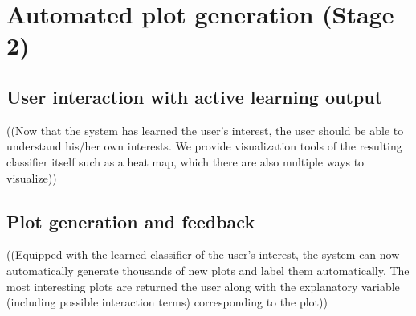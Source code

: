 \section{Automated plot generation (Stage 2)}
\label{sec:visualizer:plotgeneration}

\subsection{User interaction with active learning output}
\label{sec:visualizer:plotgeneration:user}

((Now that the system has learned the user’s interest, the user should be able to understand his/her own interests. We provide visualization tools of the resulting classifier itself such as a heat map, which there are also multiple ways to visualize))

\subsection{Plot generation and feedback}
\label{sec:visualizer:plotgeneration:feedback}

((Equipped with the learned classifier of the user’s interest, the system can now automatically generate thousands of new plots and label them automatically. The most interesting plots are returned the user along with the explanatory variable (including possible interaction terms) corresponding to the plot))